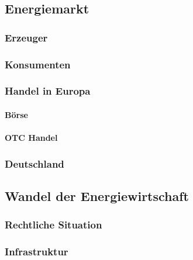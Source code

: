 \subsection{Energiemarkt}

\subsubsection{Erzeuger}

\subsubsection{Konsumenten}

\subsubsection{Handel in Europa}

\paragraph{Börse}

\paragraph{OTC Handel}

\subsubsection{Deutschland}

\subsection{Wandel der Energiewirtschaft}

\subsubsection{Rechtliche Situation}

\subsubsection{Infrastruktur}

